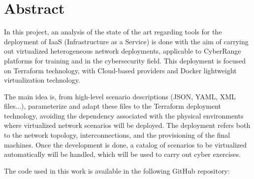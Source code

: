 \newpage
\thispagestyle{plain}
\section*{Abstract}
  
  In this project, an analysis of the state of the art regarding tools for the deployment of IaaS (Infrastructure as a Service) is done with the aim of carrying out virtualized heterogeneous network deployments, applicable to CyberRange platforms for training and in the cybersecurity field. This deployment is focused on Terraform technology, with Cloud-based providers and Docker lightweight virtualization technology.

  The main idea is, from high-level scenario descriptions (JSON, YAML, XML files...), parameterize and adapt these files to the Terraform deployment technology, avoiding the dependency associated with the physical environments where virtualized network scenarios will be deployed. The deployment refers both to the network topology, interconnections, and the provisioning of the final machines. Once the development is done, a catalog of scenarios to be virtualized automatically will be handled, which will be used to carry out cyber exercises.

  The code used in this work is available in the following GitHub repository:

  \vspace{0.2cm}

  \begin{tcolorbox}[colback=orange!5!white,colframe=orange!75!black]
  \centering\href{https://github.com/samugs13/daerv}{\textbf{\color{blue}{https://github.com/samugs13/daerv}}}
  \end{tcolorbox}


\afterpage{\blankpage}

